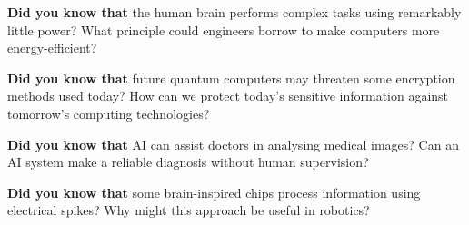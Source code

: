 \clearpage



\begin{center}
\begin{tcolorbox}[colback=SoftYellow, colframe=IEEEblue!70!black, boxrule=0.5pt, arc=0mm, left=3mm, right=3mm, top=1mm, bottom=1mm, width=0.92\textwidth]
\small\RaggedRight \textbf{\color{IEEEblue!75!black}Did you know that} the human brain performs complex tasks using remarkably little power? What principle could engineers borrow to make computers more energy-efficient?
\end{tcolorbox}
\end{center}

\clearpage



\begin{center}
\begin{tcolorbox}[colback=SoftYellow, colframe=IEEEblue!70!black, boxrule=0.5pt, arc=0mm, left=3mm, right=3mm, top=1mm, bottom=1mm, width=0.92\textwidth]
\small\RaggedRight \textbf{\color{IEEEblue!75!black}Did you know that} future quantum computers may threaten some encryption methods used today? How can we protect today's sensitive information against tomorrow's computing technologies?
\end{tcolorbox}
\end{center}

\clearpage



\begin{center}
\begin{tcolorbox}[colback=SoftYellow, colframe=IEEEblue!70!black, boxrule=0.5pt, arc=0mm, left=3mm, right=3mm, top=1mm, bottom=1mm, width=0.92\textwidth]
\small\RaggedRight \textbf{\color{IEEEblue!75!black}Did you know that} AI can assist doctors in analysing medical images? Can an AI system make a reliable diagnosis without human supervision?
\end{tcolorbox}
\end{center}

\clearpage



\begin{center}
\begin{tcolorbox}[colback=SoftYellow, colframe=IEEEblue!70!black, boxrule=0.5pt, arc=0mm, left=3mm, right=3mm, top=1mm, bottom=1mm, width=0.92\textwidth]
\small\RaggedRight \textbf{\color{IEEEblue!75!black}Did you know that} some brain-inspired chips process information using electrical spikes? Why might this approach be useful in robotics?
\end{tcolorbox}
\end{center}

